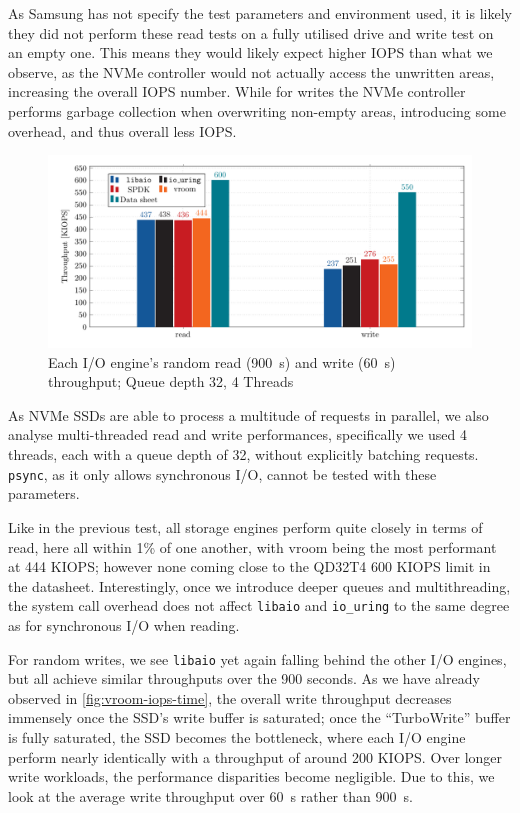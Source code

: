 As Samsung has not specify the test parameters and environment used, it is likely they did not perform these read tests on a fully utilised drive and write test on an empty one. This means they would likely expect higher IOPS than what we observe, as the NVMe controller would not actually access the unwritten areas, increasing the overall IOPS number. While for writes the NVMe controller performs garbage collection when overwriting non-empty areas, introducing some overhead, and thus overall less IOPS.


\begin{figure}
  \centering
    \includegraphics[width=\textwidth]{figures/iops-qd32-ybar}
    \caption{Each I/O engine's random read (\qty{900}{\second}) and write (\qty{60}{\second}) throughput; Queue depth 32, 4 Threads}
    \label{fig:iops-qd32}
\end{figure}

As NVMe SSDs are able to process a multitude of requests in parallel, we also analyse multi-threaded read and write performances, specifically we used 4 threads, each with a queue depth of 32, without explicitly batching requests. \texttt{psync}, as it only allows synchronous I/O, cannot be tested with these parameters.

Like in the previous test, all storage engines perform quite closely in terms of read, here all within 1\% of one another, with vroom being the most performant at 444 KIOPS; however none coming close to the QD32T4 600 KIOPS limit in the datasheet. Interestingly, once we introduce deeper queues and multithreading, the system call overhead does not affect \texttt{libaio} and \texttt{io\_uring} to the same degree as for synchronous I/O when reading.

For random writes, we see \texttt{libaio} yet again falling behind the other I/O engines, but all achieve similar throughputs over the 900 seconds. As we have already observed in \autoref{fig:vroom-iops-time}, the overall write throughput decreases immensely once the SSD's write buffer is saturated; once the ``TurboWrite'' buffer is fully saturated, the SSD becomes the bottleneck, where each I/O engine perform nearly identically with a throughput of around 200 KIOPS. Over longer write workloads, the performance disparities become negligible. Due to this, we look at the average write throughput over \qty{60}{\second} rather than \qty{900}{\second}.

